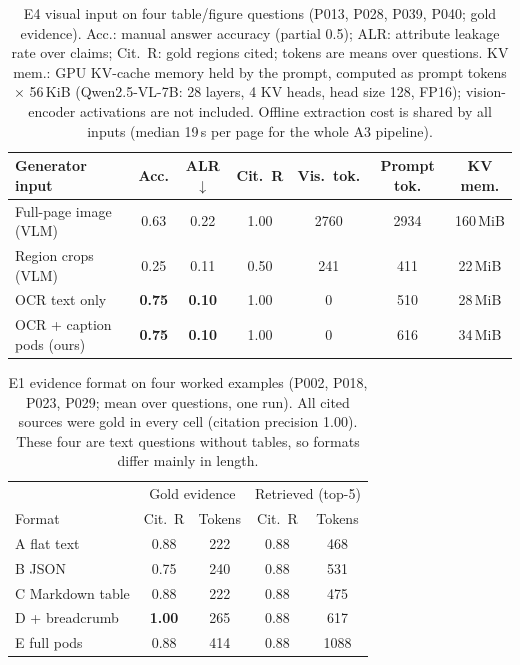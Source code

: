\begin{table}[t]
\centering\footnotesize
\caption{E4 visual input on four table/figure questions (P013, P028, P039, P040; gold evidence). Acc.: manual answer accuracy (partial 0.5); ALR: attribute leakage rate over claims; Cit.\ R: gold regions cited; tokens are means over questions. KV mem.: GPU KV-cache memory held by the prompt, computed as prompt tokens $\times$ 56\,KiB (Qwen2.5-VL-7B: 28 layers, 4 KV heads, head size 128, FP16); vision-encoder activations are not included. Offline extraction cost is shared by all inputs (median 19\,s per page for the whole A3 pipeline).}
\label{tab:e4}
\setlength{\tabcolsep}{2.5pt}
\begin{tabular}{@{}lcccccc@{}}
\toprule
Generator input & Acc. & ALR$\downarrow$ & Cit.\ R & Vis.\ tok. & Prompt tok. & KV mem. \\
\midrule
Full-page image (VLM) & 0.63 & 0.22 & 1.00 & 2760 & 2934 & 160\,MiB \\
Region crops (VLM) & 0.25 & 0.11 & 0.50 & 241 & 411 & 22\,MiB \\
OCR text only & \textbf{0.75} & \textbf{0.10} & 1.00 & 0 & 510 & 28\,MiB \\
OCR + caption pods (ours) & \textbf{0.75} & \textbf{0.10} & 1.00 & 0 & 616 & 34\,MiB \\
\bottomrule
\end{tabular}
\end{table}

\begin{table}[t]
\centering\footnotesize
\caption{E1 evidence format on four worked examples (P002, P018, P023, P029; mean over questions, one run). All cited sources were gold in every cell (citation precision 1.00). These four are text questions without tables, so formats differ mainly in length.}
\label{tab:e1}
\setlength{\tabcolsep}{3pt}
\begin{tabular}{@{}lcccc@{}}
\toprule
 & \multicolumn{2}{c}{Gold evidence} & \multicolumn{2}{c}{Retrieved (top-5)} \\
Format & Cit.\ R & Tokens & Cit.\ R & Tokens \\
\midrule
A flat text & 0.88 & 222 & 0.88 & 468 \\
B JSON & 0.75 & 240 & 0.88 & 531 \\
C Markdown table & 0.88 & 222 & 0.88 & 475 \\
D + breadcrumb & \textbf{1.00} & 265 & 0.88 & 617 \\
E full pods & 0.88 & 414 & 0.88 & 1088 \\
\bottomrule
\end{tabular}
\end{table}
